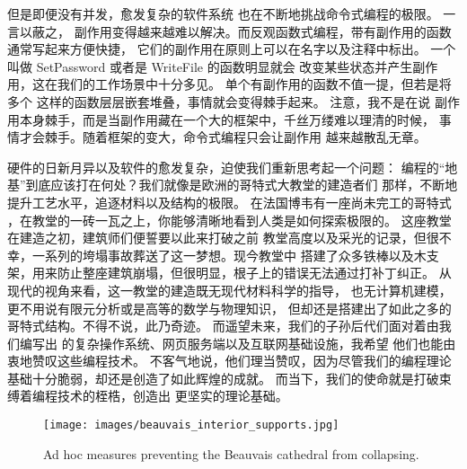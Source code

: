 但是即便没有并发，愈发复杂的软件系统
也在不断地挑战命令式编程的极限。
一言以蔽之，
副作用变得越来越难以解决。而反观函数式编程，带有副作用的函数通常写起来方便快捷，
它们的副作用在原则上可以在名字以及注释中标出。
一个叫做 SetPassword 或者是 WriteFile 的函数明显就会
改变某些状态并产生副作用，这在我们的工作场景中十分多见。
单个有副作用的函数不值一提，但若是将多个
这样的函数层层嵌套堆叠，事情就会变得棘手起来。
注意，我不是在说
副作用本身棘手，而是当副作用藏在一个大的框架中，千丝万缕难以理清的时候，
事情才会棘手。随着框架的变大，命令式编程只会让副作用
越来越散乱无章。

硬件的日新月异以及软件的愈发复杂，迫使我们重新思考起一个问题：
编程的“地基”到底应该打在何处？我们就像是欧洲的哥特式大教堂的建造者们
那样，不断地提升工艺水平，追逐材料以及结构的极限。
在法国博韦有一座尚未完工的哥特式
，在教堂的一砖一瓦之上，你能够清晰地看到人类是如何探索极限的。
这座教堂在建造之初，建筑师们便誓要以此来打破之前
教堂高度以及采光的记录，但很不幸，一系列的垮塌事故葬送了这一梦想。现今教堂中
搭建了众多铁棒以及木支架，用来防止整座建筑崩塌，但很明显，根子上的错误无法通过打补丁纠正。
从现代的视角来看，这一教堂的建造既无现代材料科学的指导，
也无计算机建模，更不用说有限元分析或是高等的数学与物理知识，
但却还是搭建出了如此之多的哥特式结构。不得不说，此乃奇迹。
而遥望未来，我们的子孙后代们面对着由我们编写出
的复杂操作系统、网页服务端以及互联网基础设施，我希望
他们也能由衷地赞叹这些编程技术。
不客气地说，他们理当赞叹，因为尽管我们的编程理论基础十分脆弱，却还是创造了如此辉煌的成就。
而当下，我们的使命就是打破束缚着编程技术的桎梏，创造出
更坚实的理论基础。

\begin{figure}
  \centering
  \texttt{[image: images/beauvais\_interior\_supports.jpg]}
  \caption{Ad hoc measures preventing the Beauvais cathedral from collapsing.}
\end{figure}